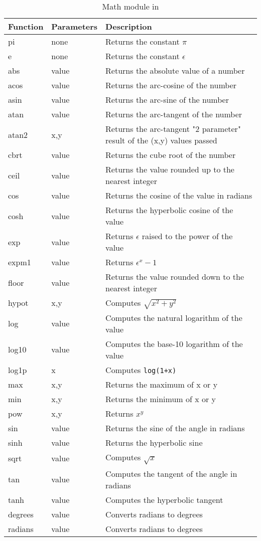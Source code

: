 \begin{table}[!h]
\centering
\begin{tabular} { | l | l | p{9cm}  | }
\hline
Function  & Parameters & Description   \\
\hline
pi & none & Returns the constant $\pi$   \\
e & none & Returns the constant $\epsilon$   \\
abs & value & Returns the absolute value of a number  \\
acos & value & Returns the arc-cosine of the number \\
asin & value & Returns the arc-sine of the number \\
atan & value & Returns the arc-tangent of the number \\
atan2 & x,y & Returns the arc-tangent "2 parameter" result of the (x,y) values passed \\
cbrt & value & Returns the cube root of the number \\
ceil & value & Returns the value rounded up to the nearest integer \\
cos & value & Returns the cosine of the value in radians \\
cosh & value & Returns the hyperbolic cosine of the value \\
exp & value & Returns $\epsilon$ raised to the power of the value \\
expm1 & value & Returns $\epsilon^x - 1 $ \\
floor & value & Returns the value rounded down to the nearest integer \\
hypot & x,y & Computes $ \sqrt { x^2 + y^2 } $ \\
log & value & Computes the natural logarithm of the value \\
log10 & value & Computes the base-10 logarithm of the value \\
log1p & x & Computes \Verb^log(1+x)^ \\
max & x,y & Returns the maximum of x or y \\
min & x,y & Returns the minimum of x or y \\
pow & x,y & Returns $x^y$ \\
sin & value & Returns the sine of the angle in radians \\
sinh & value & Returns the hyperbolic sine \\
sqrt & value & Computes $\sqrt x $ \\
tan & value & Computes the tangent of the angle in radians \\
tanh & value & Computes the hyperbolic tangent \\
degrees & value & Converts radians to degrees \\
radians & value & Converts radians to degrees \\
\hline
\end{tabular}
\caption{Math module in \Reflex}
\end{table}

